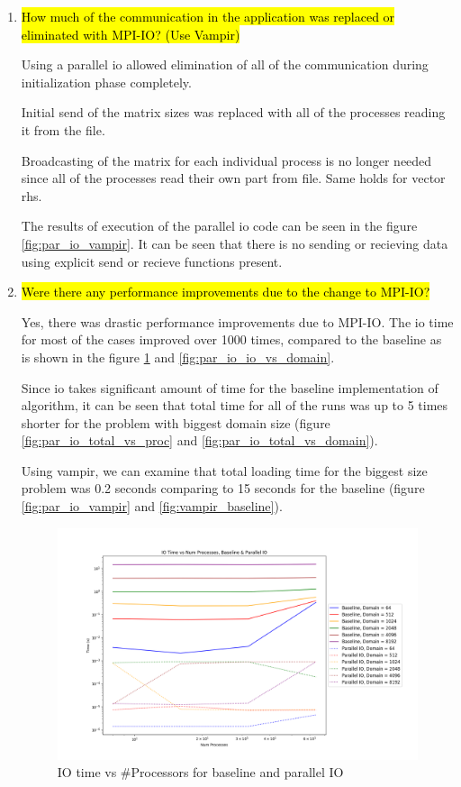 \begin{enumerate}
  \item \hl{How much of the communication in the application was replaced or eliminated with MPI-IO? (Use
Vampir)}

  Using a parallel io allowed elimination of all of the communication during initialization phase completely.

  Initial send of the matrix sizes was replaced with all of the processes reading it from the file.

  Broadcasting of the matrix for each individual process is no longer needed since all of the processes read their own 
  part from file. Same holds for vector rhs.

  The results of execution of the parallel io code can be seen in the figure \ref{fig:par_io_vampir}. It can be seen
  that there is no sending or recieving data using explicit send or recieve functions present.

  \item \hl{Were there any performance improvements due to the change to MPI-IO?}
  
  Yes, there was drastic performance improvements due to MPI-IO. The io time for most of the cases improved over 1000
  times, compared to the baseline as is shown in the figure \ref{fig:par_io_io_vs_proc} and 
  \ref{fig:par_io_io_vs_domain}.

  Since io takes significant amount of time for the baseline implementation of algorithm, it can be seen that 
  total time for all of the runs was up to 5 times shorter for the problem with biggest domain size (figure 
  \ref{fig:par_io_total_vs_proc} and \ref{fig:par_io_total_vs_domain}).

  Using vampir, we can examine that total loading time for the biggest size problem was 0.2 seconds comparing to 15 seconds
  for the baseline (figure \ref{fig:par_io_vampir} and \ref{fig:vampir_baseline}).

  \begin{figure}[p] %
    \begin{center}
      \includegraphics[width=.9\linewidth]{Figures/io/io_multdomain_haswell_io_baseline.png} %
      \caption{IO time vs \#Processors for baseline and parallel IO}
      \label{fig:par_io_io_vs_proc}
    \end{center}
 \end{figure}
 

\end{enumerate}
